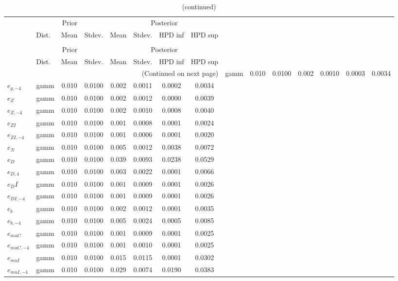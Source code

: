  
\begin{center}
\begin{longtable}{llcccccc} 
\caption{Results from Metropolis-Hastings (standard deviation of structural shocks)}
 \label{Table:MHPosterior:2}\\
\toprule 
  & \multicolumn{3}{c}{Prior}  &  \multicolumn{4}{c}{Posterior} \\
  \cmidrule(r{.75em}){2-4} \cmidrule(r{.75em}){5-8}
  & Dist. & Mean  & Stdev. & Mean & Stdev. & HPD inf & HPD sup\\
\midrule \endfirsthead 
\caption{(continued)}\\\toprule 
  & \multicolumn{3}{c}{Prior}  &  \multicolumn{4}{c}{Posterior} \\
  \cmidrule(r{.75em}){2-4} \cmidrule(r{.75em}){5-8}
  & Dist. & Mean  & Stdev. & Mean & Stdev. & HPD inf & HPD sup\\
\midrule \endhead 
\bottomrule \multicolumn{8}{r}{(Continued on next page)} \endfoot 
\bottomrule \endlastfoot 
${e_g}$ & gamm &   0.010 & 0.0100 &   0.002& 0.0010 &  0.0003 &  0.0034 \\ 
${e_{g,-4}}$ & gamm &   0.010 & 0.0100 &   0.002& 0.0011 &  0.0002 &  0.0034 \\ 
${e_Z}$ & gamm &   0.010 & 0.0100 &   0.002& 0.0012 &  0.0000 &  0.0039 \\ 
${e_{Z,-4}}$ & gamm &   0.010 & 0.0100 &   0.002& 0.0010 &  0.0008 &  0.0040 \\ 
${e_{ZI}}$ & gamm &   0.010 & 0.0100 &   0.001& 0.0008 &  0.0001 &  0.0024 \\ 
${e_{ZI,-4}}$ & gamm &   0.010 & 0.0100 &   0.001& 0.0006 &  0.0001 &  0.0020 \\ 
${e_N}$ & gamm &   0.010 & 0.0100 &   0.005& 0.0012 &  0.0038 &  0.0072 \\ 
${e_D}$ & gamm &   0.010 & 0.0100 &   0.039& 0.0093 &  0.0238 &  0.0529 \\ 
${e_{D,4}}$ & gamm &   0.010 & 0.0100 &   0.003& 0.0022 &  0.0001 &  0.0066 \\ 
${e_DI}$ & gamm &   0.010 & 0.0100 &   0.001& 0.0009 &  0.0001 &  0.0026 \\ 
${e_{DI,-4}}$ & gamm &   0.010 & 0.0100 &   0.001& 0.0009 &  0.0001 &  0.0026 \\ 
${e_b}$ & gamm &   0.010 & 0.0100 &   0.002& 0.0012 &  0.0001 &  0.0035 \\ 
${e_{b,-4}}$ & gamm &   0.010 & 0.0100 &   0.005& 0.0024 &  0.0005 &  0.0085 \\ 
${e_{muC}}$ & gamm &   0.010 & 0.0100 &   0.001& 0.0009 &  0.0001 &  0.0025 \\ 
${e_{muC,-4}}$ & gamm &   0.010 & 0.0100 &   0.001& 0.0010 &  0.0001 &  0.0025 \\ 
${e_{muI}}$ & gamm &   0.010 & 0.0100 &   0.015& 0.0115 &  0.0001 &  0.0302 \\ 
${e_{muI,-4}}$ & gamm &   0.010 & 0.0100 &   0.029& 0.0074 &  0.0190 &  0.0383 \\ 
\end{longtable}
 \end{center}
